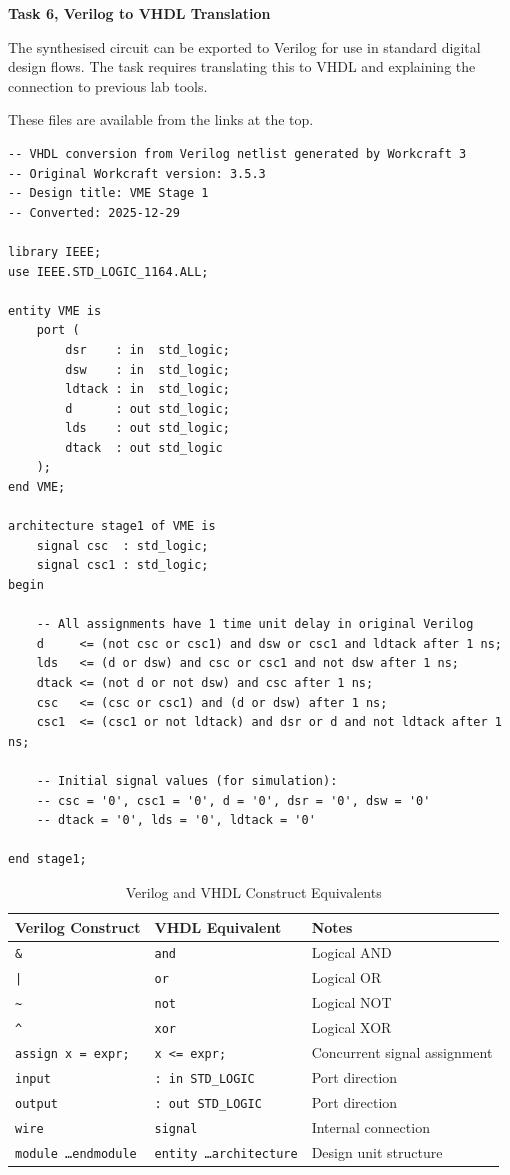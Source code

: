 \documentclass[a4paper,12pt]{article}
\begin{document}
\textbf{Task 6, Verilog to VHDL Translation}

The synthesised circuit can be exported to Verilog for use in standard digital design flows. 
The task requires translating this to VHDL and explaining the connection to previous lab tools.

These files are available from the links at the top. 

\begin{lstlisting}
-- VHDL conversion from Verilog netlist generated by Workcraft 3
-- Original Workcraft version: 3.5.3
-- Design title: VME Stage 1
-- Converted: 2025-12-29

library IEEE;
use IEEE.STD_LOGIC_1164.ALL;

entity VME is
    port (
        dsr    : in  std_logic;
        dsw    : in  std_logic;
        ldtack : in  std_logic;
        d      : out std_logic;
        lds    : out std_logic;
        dtack  : out std_logic
    );
end VME;

architecture stage1 of VME is
    signal csc  : std_logic;
    signal csc1 : std_logic;
begin

    -- All assignments have 1 time unit delay in original Verilog
    d     <= (not csc or csc1) and dsw or csc1 and ldtack after 1 ns;
    lds   <= (d or dsw) and csc or csc1 and not dsw after 1 ns;
    dtack <= (not d or not dsw) and csc after 1 ns;
    csc   <= (csc or csc1) and (d or dsw) after 1 ns;
    csc1  <= (csc1 or not ldtack) and dsr or d and not ldtack after 1 ns;

    -- Initial signal values (for simulation):
    -- csc = '0', csc1 = '0', d = '0', dsr = '0', dsw = '0'
    -- dtack = '0', lds = '0', ldtack = '0'

end stage1;
\end{lstlisting}

\begin{table}[h]
\centering
\caption{Verilog and VHDL Construct Equivalents}
\label{tab:verilog_vhdl_equiv}
\renewcommand{\arraystretch}{1.3}
\begin{tabular}{l|l|l}
\hline
\textbf{Verilog Construct} & \textbf{VHDL Equivalent} & \textbf{Notes} \\ \hline
\texttt{\&} & \texttt{and} & Logical AND \\ \hline
\texttt{|} & \texttt{or} & Logical OR \\ \hline
\texttt{\textasciitilde} & \texttt{not} & Logical NOT \\ \hline
\texttt{\^} & \texttt{xor} & Logical XOR \\ \hline
\texttt{assign x = expr;} & \texttt{x <= expr;} & Concurrent signal assignment \\ \hline
\texttt{input} & \texttt{: in STD\_LOGIC} & Port direction \\ \hline
\texttt{output} & \texttt{: out STD\_LOGIC} & Port direction \\ \hline
\texttt{wire} & \texttt{signal} & Internal connection \\ \hline
\texttt{module \ldots endmodule} & \texttt{entity \ldots architecture} & Design unit structure \\ \hline
\end{tabular}
\end{table}
\end{document}
